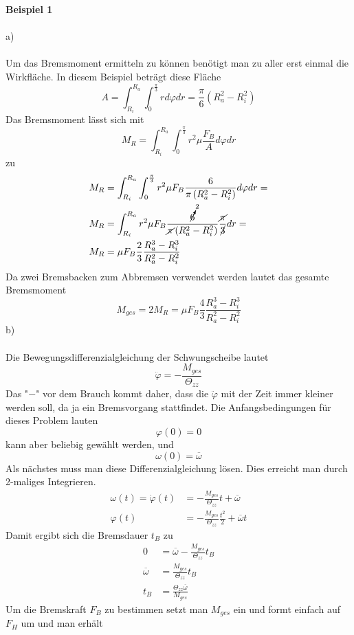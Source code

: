 \textbf{Beispiel 1} \\ \\
a)\\ \\
Um das Bremsmoment ermitteln zu können benötigt man zu aller erst einmal die Wirkfläche. In diesem  Beispiel beträgt diese Fläche
\[
	A = \int_{R_i}^{R_a}\int_{0}^{\frac{\pi}{3}}rd\varphi dr = \frac{\pi}{6}\left(R_a^2 - R_i^2\right)
\]
Das Bremsmoment lässt sich mit 
\[
	M_R = \int_{R_i}^{R_a}\int_{0}^{\frac{\pi}{3}} r^2\mu\frac{F_B}{A}d\varphi dr
\]
zu 
\begin{align*}
	M_R &= \int_{R_i}^{R_a}\int_{0}^{\frac{\pi}{3}} r^2\mu F_B \frac{6}{\pi \left(R_a^2 - R_i^2\right)}d\varphi dr = \\
	M_R &= \int_{R_i}^{R_a} r^2 \mu F_B \frac{\cancelto{2}{6}}{\cancel{\pi} \left(R_a^2 - R_i^2\right)} \frac{\cancel{\pi}}{\cancel{3}} dr = \\
	M_R &= \mu F_B \frac{2}{3}\frac{R_a^3 - R_i^3}{R_a^2 - R_i^2}
\end{align*}
Da zwei Bremsbacken zum Abbremsen verwendet werden lautet das gesamte Bremsmoment 
\[
	M_{ges} = 2M_R = \mu F_B \frac{4}{3}\frac{R_a^3 - R_i^3}{R_a^2 - R_i^2}
\]
b) \\ \\
Die Bewegungsdifferenzialgleichung der Schwungscheibe lautet
\[
	\ddot{\varphi} = - \frac{M_{ges}}{\Theta_{zz}}
\]
Das "$-$" vor dem Brauch kommt daher, dass die $\ddot{\varphi}$ mit der Zeit immer kleiner werden soll, da ja ein Bremsvorgang stattfindet.
Die Anfangsbedingungen für dieses Problem lauten
\[
	\varphi(0) = 0
\]
kann aber beliebig gewählt werden, und 
\[
	\omega(0) = \overline{\omega}
\]
\newpage
\noindent
Als nächstes muss man diese Differenzialgleichung lösen. Dies erreicht man durch 2-maliges Integrieren.
\begin{align*}
	\omega(t) = \dot{\varphi}(t) &= - \frac{M_{ges}}{\Theta_{zz}}t + \overline{\omega} \\
	\varphi(t) &= - \frac{M_{ges}}{\Theta_{zz}} \frac{t^2}{2} + \overline{\omega}t
\end{align*}
Damit ergibt sich die Bremsdauer $t_B$ zu
\begin{align*}
	0 &= \overline{\omega} - \frac{M_{ges}}{\Theta_{zz}}t_B \\ 
	\overline{\omega} &= \frac{M_{ges}}{\Theta_{zz}}t_B \\
	t_B &= \frac{\Theta_{zz}\overline{\omega}}{M_{ges}}
\end{align*}
Um die Bremskraft $F_B$ zu bestimmen setzt man $M_{ges}$ ein und formt einfach auf $F_H$ um und man erhält
